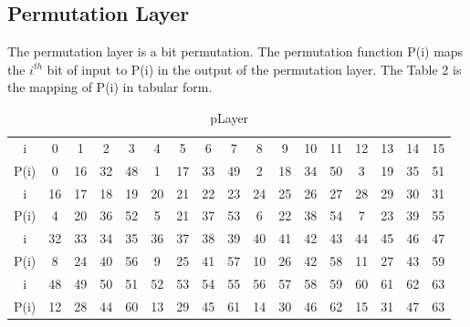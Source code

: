 \documentclass[journal=tosc,preprint]{iacrtrans}
\begin{document}
\subsection{Permutation Layer}
The permutation layer is a bit permutation. The permutation function P(i) maps the $i^{th}$ bit of input to P(i) in the output of the permutation layer. The Table 2 is the mapping of P(i) in tabular form.
\begin{table}[h!]
	\caption{pLayer}
	\centering
	\begin{tabular}{ |c||c|c|c|c|c|c|c|c|c|c|c|c|c|c|c|c| }
		\hline
		i& 0 &1 &2 &3& 4& 5& 6 &7 &8 &9 &10 &11 &12 &13 &14 &15 \\
		P(i) &0& 16& 32& 48& 1& 17& 33&49& 2 &18& 34& 50& 3 &19 &35 &51 \\\hline\hline
		i &16& 17& 18& 19& 20& 21 &22& 23 &24 &25 &26 &27 &28 &29 &30 &31 \\
		P(i)& 4 &20 &36& 52& 5& 21 &37& 53& 6 &22& 38& 54& 7 &23 &39 &55 \\\hline\hline
		i &32& 33& 34& 35& 36& 37 &38& 39 &40 &41 &42 &43 &44 &45 &46 &47 \\
		P(i) &8 &24& 40& 56 &9& 25 &41 &57 &10 &26 &42 &58 &11 &27 &43 &59 \\\hline\hline
		i &48& 49& 50 &51 &52 &53& 54& 55 &56 &57 &58 &59 &60 &61 &62 &63 \\
		P(i) &12& 28& 44&60& 13 &29& 45& 61 &14 &30 &46 &62 &15 &31 &47 &63 \\\hline
	\end{tabular}
	
\end{table}
\end{document}
